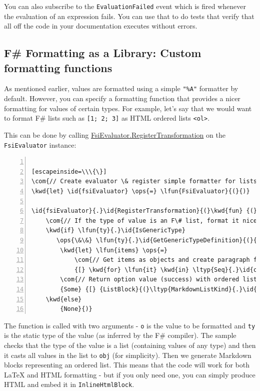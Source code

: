 \documentclass{article}
\newcommand{\id}[1]{\textcolor{black}{#1}}
\newcommand{\com}[1]{\textcolor{officegreen}{#1}}
\newcommand{\kwd}[1]{\textcolor{navy}{#1}}
\newcommand{\ops}[1]{\textcolor{purple}{#1}}
\begin{document}
You can also subscribe to the \texttt{EvaluationFailed} event which is fired whenever the evaluation
of an expression fails. You can use that to do tests that verify that all off the code in your
documentation executes without errors.
\subsection*{F\# Formatting as a Library: Custom formatting functions}



As mentioned earlier, values are formatted using a simple \texttt{"\%A"} formatter by default.
However, you can specify a formatting function that provides a nicer formatting for values
of certain types. For example, let's say that we would want to format F\# lists such as
\texttt{[1; 2; 3]} as HTML ordered lists \texttt{<ol>}.


This can be done by calling \href{https://fsprojects.github.io/FSharp.Formatting/reference/fsharp-formatting-literate-evaluation-fsievaluator.html}{FsiEvaluator.RegisterTransformation} on the \texttt{FsiEvaluator} instance:
\begin{lstlisting}[numbers=left]

[escapeinside=\\\{\}]
\com{// Create evaluator \& register simple formatter for lists}
\kwd{let} \id{fsiEvaluator} \ops{=} \lfun{FsiEvaluator}{(}{)}

\id{fsiEvaluator}{.}\id{RegisterTransformation}{(}\kwd{fun} {(}\lfun{o}{,} \lfun{ty}{,} \id{\_executionCount}{)} \kwd{->}
    \com{// If the type of value is an F\# list, format it nicely}
    \kwd{if} \lfun{ty}{.}\id{IsGenericType}
       \ops{\&\&} \lfun{ty}{.}\id{GetGenericTypeDefinition}{(}{)} \ops{=} \kwd{typedefof}{<}\ltyp{list}{<}\id{\_}{>}{>} \kwd{then}
        \kwd{let} \lfun{items} \ops{=}
            \com{// Get items as objects and create paragraph for each item}
            {[} \kwd{for} \lfun{it} \kwd{in} \ltyp{Seq}{.}\id{cast}{<}\ltyp{obj}{>} {(}\lfun{unbox} \lfun{o}{)} \kwd{->} {[} {Paragraph}{(}{[} {Literal}{(}\lfun{it}{.}\id{ToString}{(}{)}{,} {None}{)} {]}{,} {None}{)} {]} {]}
        \com{// Return option value (success) with ordered list}
        {Some} {[} {ListBlock}{(}\ltyp{MarkdownListKind}{.}\id{Ordered}{,} \lfun{items}{,} {None}{)} {]}
    \kwd{else}
        {None}{)}

\end{lstlisting}



The function is called with two arguments - \texttt{o} is the value to be formatted and \texttt{ty}
is the static type of the value (as inferred by the F\# compiler). The sample checks
that the type of the value is a list (containing values of any type) and then it
casts all values in the list to \texttt{obj} (for simplicity). Then we generate Markdown
blocks representing an ordered list. This means that the code will work for both
LaTeX and HTML formatting - but if you only need one, you can simply produce HTML and
embed it in \texttt{InlineHtmlBlock}.
\end{document}
